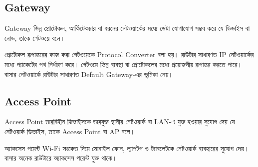 \subsection{Gateway}

\begin{definitionbox}{Gateway}
ভিন্ন প্রোটোকল, আর্কিটেকচার বা ধরনের নেটওয়ার্কের মধ্যে ডেটা যোগাযোগ সম্ভব করে যে ডিভাইস বা নোড, তাকে গেটওয়ে বলে।
\end{definitionbox}

প্রোটোকল রূপান্তরের কাজ করা গেটওয়েকে Protocol Converter বলা হয়। রাউটার সাধারণত IP নেটওয়ার্কের মধ্যে প্যাকেটের পথ নির্ধারণ করে। গেটওয়ে ভিন্ন ব্যবস্থা বা প্রোটোকলের মধ্যে প্রয়োজনীয় রূপান্তর করতে পারে। বাসার নেটওয়ার্কে রাউটার সাধারণত Default Gateway-এর ভূমিকা নেয়।



\subsection{Access Point}

\begin{definitionbox}{Access Point}
তারবিহীন ডিভাইসকে তারযুক্ত স্থানীয় নেটওয়ার্ক বা LAN-এ যুক্ত হওয়ার সুযোগ দেয় যে নেটওয়ার্ক ডিভাইস, তাকে Access Point বা AP বলে।
\end{definitionbox}

অ্যাকসেস পয়েন্ট Wi-Fi সংকেত দিয়ে মোবাইল ফোন, ল্যাপটপ ও ট্যাবলেটকে নেটওয়ার্ক ব্যবহারের সুযোগ দেয়। বাসার অনেক রাউটারে অ্যাকসেস পয়েন্ট যুক্ত থাকে।

